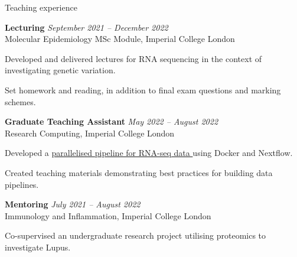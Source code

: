 \documentclass{resume}
\begin{document}
\begin{rSection}{Teaching experience}

\textbf{Lecturing} \hfill  \textit{September 2021 -- December 2022} \\
Molecular Epidemiology MSc Module, Imperial College London
\vspace{2pt plus 1pt minus 1pt}
\item Developed and delivered lectures for RNA sequencing in the context of investigating genetic variation. 
\item Set homework and reading, in addition to final exam questions and marking schemes.

\pagebreak

\textbf{Graduate Teaching Assistant} \hfill  \textit{May 2022 -- August 2022} \\
Research Computing, Imperial College London
\vspace{2pt plus 1pt minus 1pt}
\item Developed a \href{https://github.com/ImperialCollegeLondon/ReCoDE_rnaseq_pipeline}{parallelised pipeline for RNA-seq data \faGithub} using Docker and Nextflow. 
\item Created teaching materials demonstrating best practices for building data pipelines.

\textbf{Mentoring} \hfill  \textit{July 2021 -- August 2022} \\
Immunology and Inflammation, Imperial College London
\vspace{2pt plus 1pt minus 1pt}
\item Co-supervised an undergraduate research project utilising proteomics to investigate Lupus.

\end{rSection}
\end{document}
